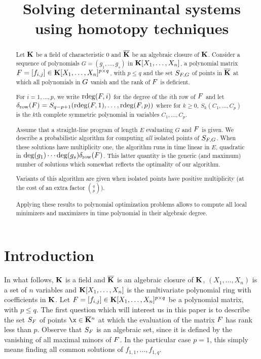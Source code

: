 \documentclass[12pt]{article}
\title{Solving determinantal systems using homotopy techniques}
\begin{document}
\maketitle

\begin{abstract}
  Let $\mathbf{K}$ be a field of characteristic $0$ and $\overline{\mathbf{K}}$ be an
  algebraic closure of $\mathbf{K}$. Consider a sequence of polynomials
  $G=(g_1,\dots,g_s)$ in $\mathbf{K}[X_1,\dots,X_n]$, a polynomial matrix
  ${F}=[f_{i,j}] \in \mathbf{K}[X_1,\dots,X_n]^{p \times q}$, with $p \leq q$
  and the set $S_{{F}, G}$ of points in $\overline{\mathbf{K}}$ at which all polynomials in ${G}$
  vanish and the rank of ${F}$ is deficient.

  For $i=1,\dots,p$, we write $\mathrm{rdeg}({F},i)$ for the degree of the
  $i$th row of ${F}$ and let
  $\delta_{\rm row}({F}) = S_{q-p+1}(\mathrm{rdeg}({F},1), \ldots,
  \mathrm{rdeg}({F},p))$
  where for $k\ge 0$, $S_k(C_1,\dots,C_p)$ is the $k$th complete
  symmetric polynomial in variables $C_1,\dots,C_p$.

  Assume that a straight-line program of length $E$ evaluating $G$ and
  ${F}$ is given.  We describe a probabilistic algorithm for computing
  \emph{all} isolated points of $S_{{F}, G}$. When these solutions
  have multiplicity one, the algorithm runs in time linear in $E$,
  quadratic in $\deg(g_1)\cdots \deg(g_s)\delta_{{\rm row}}({F})$.
  This latter quantity is the generic (and maximum) number of
  solutions which somewhat reflects the optimality of our algorithm.

  Variants of this algorithm are given when isolated points have
  positive multiplicity (at the cost of an extra factor
  ${{q}\choose{p}}$). 

  Applying these results to polynomial optimization problems allows to
  compute all local minimizers and maximizers in time polynomial in
  their algebraic degree.
\end{abstract}

\section{Introduction}\label{sec:intro}

In what follows, $\mathbf{K}$ is a field and $\overline{\mathbf{K}}$ is an algebraic closure
of $\mathbf{K}$, $(X_1, \ldots, X_n)$ is a set of $n$ variables and
$\mathbf{K}[X_1,\dots,X_n]$ is the multivariate polynomial ring with
coefficients in $\mathbf{K}$. Let
${F}=[f_{i,j}] \in \mathbf{K}[X_1,\dots,X_n]^{p \times q}$ be a polynomial
matrix, with $p \leq q$. The first question which will interest us in
this paper is to describe the set $S_{{F}}$ of points
$\x \in \KKbar{}^n$ at which the evaluation of the matrix ${F}$ has
rank less than $p$. Observe that $S_{{F}}$ is an algebraic set, since it
is defined by the vanishing of all maximal minors of ${F}$.  In the
particular case $p=1$, this simply means finding all common solutions
of $f_{1,1},\dots,f_{1,q}$. 
\end{document}

